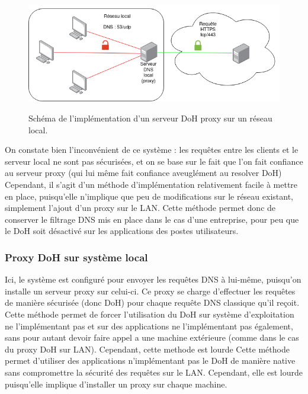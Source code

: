 \documentclass[a4paper,12pt]{article}
\begin{document}
	\begin{figure}[H]
		\begin{center}
			{\includegraphics[scale=0.6]{Images/schema_doh_proxy_lan.png}}
		\end{center}
		\caption{Schéma de l'implémentation d'un serveur DoH proxy sur un réseau local.}
	\end{figure}
	
	On constate bien l'inconvénient de ce système : les requêtes entre les clients et le serveur local ne sont pas sécurisées, et on se base sur le fait que l'on fait confiance au serveur proxy (qui lui même fait confiance aveuglément au resolver DoH)
	Cependant, il s'agit d'un méthode d'implémentation relativement facile à mettre en place, puisqu'elle n'implique que peu de modifications sur le réseau existant, simplement l'ajout d'un proxy sur le LAN.
	Cette méthode permet donc de conserver le filtrage DNS mis en place dans le cas d'une entreprise, pour peu que le DoH soit désactivé sur les applications des postes utilisateurs.
	
	\subsubsection{Proxy DoH sur système local}
	
	Ici, le système est configuré pour envoyer les requêtes DNS à lui-même, puisqu'on installe un serveur proxy sur celui-ci. Ce proxy se charge d'effectuer les requêtes de manière sécurisée (donc DoH) pour chaque requête DNS classique qu'il reçoit.
	Cette méthode permet de forcer l'utilisation du DoH sur système d'exploitation ne l'implémentant pas et sur des applications ne l'implémentant pas également, sans pour autant devoir faire appel a une machine extérieure (comme dans le cas du proxy DoH sur LAN).
	Cependant, cette methode est lourde 
	Cette méthode permet d'utiliser des applications n'implémentant pas le DoH de manière native sans compromettre la sécurité des requêtes sur le LAN. Cependant, elle est lourde puisqu'elle implique d'installer un proxy sur chaque machine.
	
\end{document}
